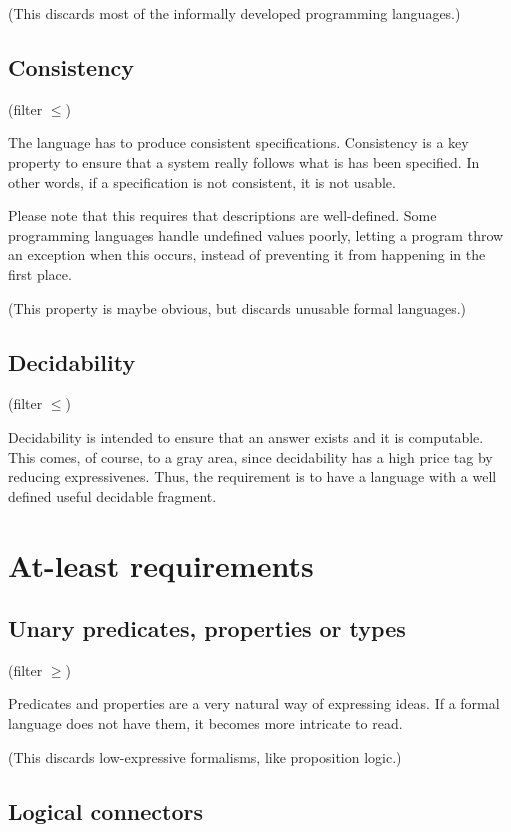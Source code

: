 (This discards most of the informally developed programming languages.)

\subsection{Consistency}

(filter $\leq $)

The language has to produce consistent specifications.
Consistency is a key property to ensure that a system really follows what is has been specified.
In other words, if a specification is not consistent, it is not usable.

Please note that this requires that descriptions are well-defined.
Some programming languages handle undefined values poorly, letting a program throw an exception when this occurs, instead of preventing it from happening in the first place.

(This property is maybe obvious, but discards unusable formal languages.)

\subsection{Decidability}

(filter $\leq $)

Decidability is intended to ensure that an answer exists and it is computable.
This comes, of course, to a gray area, since decidability has a high price tag by reducing expressivenes.
Thus, the requirement is to have a language with a well defined useful decidable fragment.


\section{At-least requirements}

\subsection{Unary predicates, properties or types}

(filter $\geq $)

Predicates and properties are a very natural way of expressing ideas.
If a formal language does not have them, it becomes more intricate to read.

(This discards low-expressive formalisms, like proposition logic.)

\subsection{Logical connectors}

